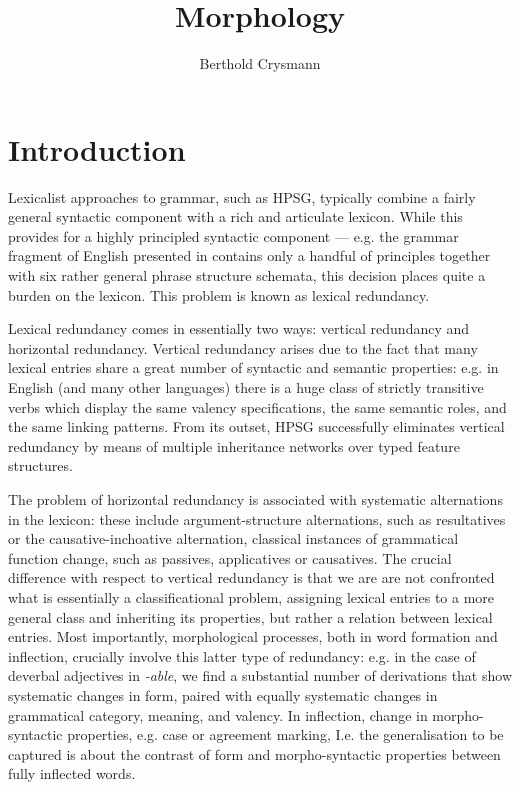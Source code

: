 \author{Berthold Crysmann
}
\title{Morphology} 
\abstract{
   \mbox{~}
% 
% 
}


\avmfont{\normalfont\scshape}
\avmvalfont{\normalfont\itshape}
\avmsortfont{\normalfont\small\itshape}


\maketitle


\section{Introduction}
\label{sec:Intro}

Lexicalist approaches to grammar, such as HPSG, typically combine a
fairly general syntactic component with a rich and articulate
lexicon. While this provides for a highly principled syntactic
component --- e.g. the grammar fragment of English presented in
\citet{Pollard94} contains only a handful of principles together with
six rather general phrase structure schemata, this decision places
quite a burden on the lexicon. This problem is known as lexical
redundancy.

Lexical redundancy comes in essentially two ways: vertical redundancy
and horizontal redundancy. Vertical redundancy  arises due to the fact
that many lexical entries share a great number of syntactic and
semantic properties: e.g. in English (and many other languages) there
is a huge class of strictly transitive verbs which display the same
valency specifications, the same semantic roles, and the same linking
patterns. From its outset, HPSG successfully eliminates vertical redundancy by
means of multiple inheritance networks over typed feature structures. 

The problem of horizontal redundancy is associated with systematic
alternations in the lexicon: these include argument-structure
alternations, such as resultatives or the causative-inchoative
alternation, classical instances of grammatical function change, such
as passives, applicatives or causatives. The crucial difference with
respect to vertical redundancy is that we are are not confronted what
is essentially a classificational problem, assigning lexical entries
to a more general class and inheriting its properties, but rather a
relation between lexical entries. Most importantly, morphological
processes, both in word formation and inflection, crucially involve
this latter type of redundancy: e.g. in the case of deverbal
adjectives in \textit{-able}, we find a substantial number of
derivations that show systematic changes in form, paired with equally
systematic changes in grammatical category, meaning, and
valency. In inflection, change in morpho-syntactic properties,
e.g. case or agreement marking,
I.e. the generalisation to be captured
is about the contrast of form  and morpho-syntactic properties between
fully inflected words. 

